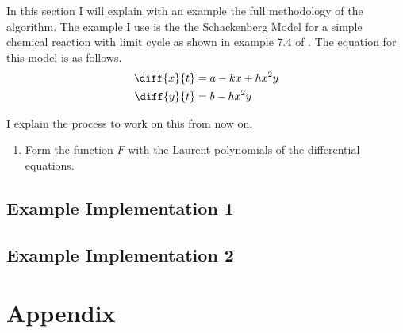 \documentclass[oneside, a4paper, onecolumn, 11pt]{article}
\begin{document}
In this section I will explain with an example the full methodology of the algorithm. The example I use is the the Schackenberg Model for a simple chemical reaction with limit cycle as shown in example 7.4 of \cite{Hubert2013}. The equation for this model is as follows.
\begin{align*}
    \diff{x}{t}
     & = a - kx + hx^2y \\
    \diff{y}{t}
     & = b - h x^2 y
\end{align*}

I explain the process to work on this from now on.

\begin{enumerate}[label=Step \arabic*:]
    \item Form the function \(F\) with the Laurent polynomials of the differential equations.
\end{enumerate}

\subsection{Example Implementation 1}

\subsection{Example Implementation 2}

\newpage



\newpage
\appendix

\section{Appendix}
\label{sec:appendix}
\end{document}
